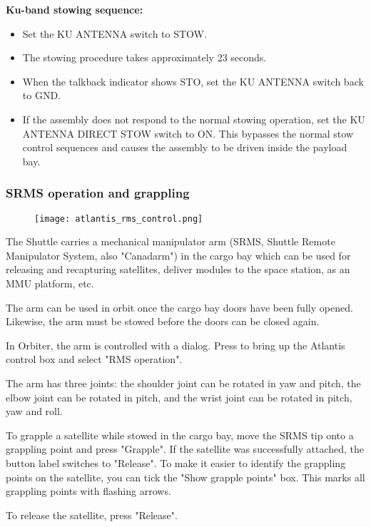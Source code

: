 \documentclass[Orbiter User Manual.tex]{subfiles}
\begin{document}
\noindent
\textbf{Ku-band stowing sequence:}
\begin{itemize}
\item Set the KU ANTENNA switch to STOW.
\item The stowing procedure takes approximately 23 seconds.
\item When the talkback indicator shows STO, set the KU ANTENNA switch back to GND.
\item If the assembly does not respond to the normal stowing operation, set the KU ANTENNA DIRECT STOW switch to ON. This bypasses the normal stow control sequences and causes the assembly to be driven inside the payload bay.
\end{itemize}

\subsubsection{SRMS operation and grappling}

\begin{figure}[H]
  \centering
  \texttt{[image: atlantis\_rms\_control.png]}
\end{figure}

\noindent
The Shuttle carries a mechanical manipulator arm (SRMS, Shuttle Remote Manipulator System, also "Canadarm") in the cargo bay which can be used for releasing and recapturing satellites, deliver modules to the space station, as an MMU platform, etc.

The arm can be used in orbit once the cargo bay doors have been fully opened. Likewise, the arm must be stowed before the doors can be closed again.

In Orbiter, the arm is controlled with a dialog. Press  to bring up the Atlantis control box and select "RMS operation".

The arm has three joints: the shoulder joint can be rotated in yaw and pitch, the elbow joint can be rotated in pitch, and the wrist joint can be rotated in pitch, yaw and roll.

To grapple a satellite while stowed in the cargo bay, move the SRMS tip onto a grappling point and press "Grapple". If the satellite was successfully attached, the button label switches to "Release". To make it easier to identify the grappling points on the satellite, you can tick the "Show grapple points" box. This marks all grappling points with flashing arrows.

To release the satellite, press "Release".
\end{document}
